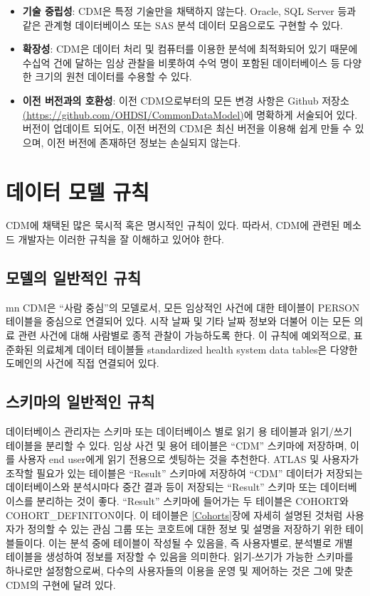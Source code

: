 \documentclass[10.5pt]{book}
\theoremstyle{definition}
\theoremstyle{definition}
\theoremstyle{definition}
\theoremstyle{remark}
\begin{document}
\begin{itemize}
\item
  \textbf{기술 중립성}: CDM은 특정 기술만을 채택하지 않는다. Oracle, SQL
  Server 등과 같은 관계형 데이터베이스 또는 SAS 분석 데이터 모음으로도
  구현할 수 있다.
\item
  \textbf{확장성}: CDM은 데이터 처리 및 컴퓨터를 이용한 분석에
  최적화되어 있기 때문에 수십억 건에 달하는 임상 관찰을 비롯하여 수억
  명이 포함된 데이터베이스 등 다양한 크기의 원천 데이터를 수용할 수
  있다.
\item
  \textbf{이전 버전과의 호환성}: 이전 CDM으로부터의 모든 변경 사항은
  Github 저장소
  \href{https://github.com/OHDSI/CommonDataModel}{(https://github.com/OHDSI/CommonDataModel)}에
  명확하게 서술되어 있다. 버전이 업데이트 되어도, 이전 버전의 CDM은 최신
  버전을 이용해 쉽게 만들 수 있으며, 이전 버전에 존재하던 정보는
  손실되지 않는다.
\end{itemize}

\section{데이터 모델 규칙}\label{--}

CDM에 채택된 많은 묵시적 혹은 명시적인 규칙이 있다. 따라서, CDM에 관련된
메소드 개발자는 이러한 규칙을 잘 이해하고 있어야 한다.

\subsection{모델의 일반적인 규칙}\label{model-Conv}

mn CDM은 ``사람 중심''의 모델로서, 모든 임상적인 사건에 대한 테이블이
PERSON 테이블을 중심으로 연결되어 있다. 시작 날짜 및 기타 날짜 정보와
더불어 이는 모든 의료 관련 사건에 대해 사람별로 종적 관찰이 가능하도록
한다. 이 규칙에 예외적으로, 표준화된 의료체계 데이터 테이블들
standardized health system data tables은 다양한 도메인의 사건에 직접
연결되어 있다.

\subsection{스키마의 일반적인 규칙}\label{--}

데이터베이스 관리자는 스키마 또는 데이터베이스 별로 읽기 용 테이블과
읽기/쓰기 테이블을 분리할 수 있다. 임상 사건 및 용어 테이블은 ``CDM''
스키마에 저장하며, 이를 사용자 end user에게 읽기 전용으로 셋팅하는 것을
추천한다. ATLAS 및 사용자가 조작할 필요가 있는 테이블은 ``Result''
스키마에 저장하여 ``CDM'' 데이터가 저장되는 데이터베이스와 분석시마다
중간 결과 등이 저장되는 ``Result'' 스키마 또는 데이터베이스를 분리하는
것이 좋다. ``Result'' 스키마에 들어가는 두 테이블은 COHORT와
COHORT\_DEFINITON이다. 이 테이블은 \ref{Cohorts}장에 자세히 설명된
것처럼 사용자가 정의할 수 있는 관심 그룹 또는 코호트에 대한 정보 및
설명을 저장하기 위한 테이블들이다. 이는 분석 중에 테이블이 작성될 수
있음을, 즉 사용자별로, 분석별로 개별 테이블을 생성하여 정보를 저장할 수
있음을 의미한다. 읽기-쓰기가 가능한 스키마를 하나로만 설정함으로써,
다수의 사용자들의 이용을 운영 및 제어하는 것은 그에 맞춘 CDM의 구현에
달려 있다.
\end{document}
